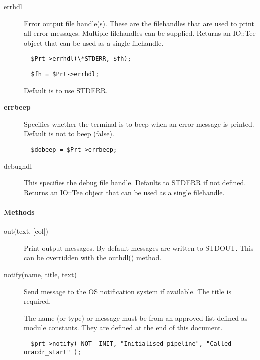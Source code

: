 \begin{description}
\begin{description}
\begin{description}
\item[{errhdl}] \mbox{}

Error output file handle(s). These are the filehandles that are used
to print all error messages. Multiple filehandles can be supplied.
Returns an IO::Tee object that can be used as a single filehandle.

\begin{verbatim}
  $Prt->errhdl(\*STDERR, $fh);
\end{verbatim}
\begin{verbatim}
  $fh = $Prt->errhdl;
\end{verbatim}


Default is to use STDERR.


\item[{\textbf{errbeep}}] \mbox{}

Specifies whether the terminal is to beep when an error
message is printed. Default is not to beep (false).

\begin{verbatim}
  $dobeep = $Prt->errbeep;
\end{verbatim}

\item[{debughdl}] \mbox{}

This specifies the debug file handle. Defaults to STDERR if not
defined. Returns an IO::Tee object that can be used as a single
filehandle.

\end{description}
\paragraph*{Methods\label{ORAC::Print_Methods}}
\begin{description}

\item[{out(text, [col])}] \mbox{}

Print output messages.
By default messages are written to STDOUT. This can be overridden with
the outhdl() method.


\item[{notify(name, title, text)}] \mbox{}

Send message to the OS notification system if available. The title
is required.



The name (or type) or message must be from an approved list defined
as module constants. They are defined at the end of this document.

\begin{verbatim}
  $prt->notify( NOT__INIT, "Initialised pipeline", "Called oracdr_start" );
\end{verbatim}


\end{description}
\end{description}
\end{description}
